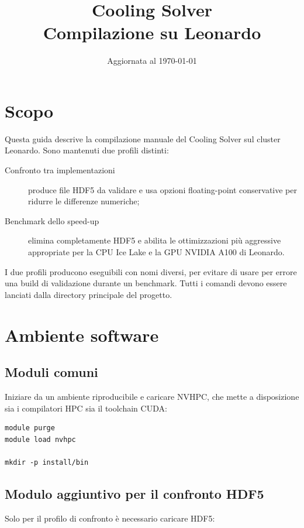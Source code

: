 \documentclass[11pt,a4paper]{article}
\title{Cooling Solver\\Compilazione su Leonardo}
\author{}
\date{Aggiornata al \today}
\begin{document}
\maketitle

\section{Scopo}

Questa guida descrive la compilazione manuale del Cooling Solver sul cluster
Leonardo. Sono mantenuti due profili distinti:

\begin{description}
  \item[Confronto tra implementazioni] produce file HDF5 da validare e usa
  opzioni floating-point conservative per ridurre le differenze numeriche;
  \item[Benchmark dello speed-up] elimina completamente HDF5 e abilita le
  ottimizzazioni più aggressive appropriate per la CPU Ice Lake e la GPU
  NVIDIA A100 di Leonardo.
\end{description}

I due profili producono eseguibili con nomi diversi, per evitare di usare per
errore una build di validazione durante un benchmark. Tutti i comandi devono
essere lanciati dalla directory principale del progetto.

\section{Ambiente software}

\subsection{Moduli comuni}

Iniziare da un ambiente riproducibile e caricare NVHPC, che mette a
disposizione sia i compilatori HPC sia il toolchain CUDA:

\begin{lstlisting}[style=shell]
module purge
module load nvhpc

mkdir -p install/bin
\end{lstlisting}

\subsection{Modulo aggiuntivo per il confronto HDF5}

Solo per il profilo di confronto è necessario caricare HDF5:
\end{document}
